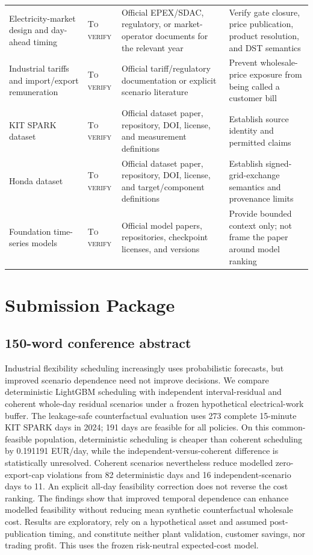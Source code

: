 \documentclass[10pt,twocolumn]{article}
\newcommand{\tverify}{\textsc{To verify}}
\begin{document}
\begin{table}[h]
\begin{tabularx}{\textwidth}{p{}p{}X X}
Electricity-market design and day-ahead timing & \tverify & Official EPEX/SDAC, regulatory, or market-operator documents for the relevant year & Verify gate closure, price publication, product resolution, and DST semantics\\
Industrial tariffs and import/export remuneration & \tverify & Official tariff/regulatory documentation or explicit scenario literature & Prevent wholesale-price exposure from being called a customer bill\\
KIT SPARK dataset & \tverify & Official dataset paper, repository, DOI, license, and measurement definitions & Establish source identity and permitted claims\\
Honda dataset & \tverify & Official dataset paper, repository, DOI, license, and target/component definitions & Establish signed-grid-exchange semantics and provenance limits\\
Foundation time-series models & \tverify & Official model papers, repositories, checkpoint licenses, and versions & Provide bounded context only; not frame the paper around model ranking\\
\bottomrule
\end{tabularx}
\end{table}

\section{Submission Package}
\label{app:submission}

\subsection{150-word conference abstract}

Industrial flexibility scheduling increasingly uses probabilistic forecasts,
but improved scenario dependence need not improve decisions. We compare
deterministic LightGBM scheduling with independent interval-residual and
coherent whole-day residual scenarios under a frozen hypothetical
electrical-work buffer. The leakage-safe counterfactual evaluation uses 273
complete 15-minute KIT SPARK days in 2024; 191 days are feasible for all
policies. On this common-feasible population, deterministic scheduling is
cheaper than coherent scheduling by 0.191191 EUR/day, while the
independent-versus-coherent difference is statistically unresolved. Coherent
scenarios nevertheless reduce modelled zero-export-cap violations from 82
deterministic days and 16 independent-scenario days to 11. An explicit all-day
feasibility correction does not reverse the cost ranking. The findings show
that improved temporal dependence can enhance modelled feasibility without
reducing mean synthetic counterfactual wholesale cost. Results are exploratory,
rely on a hypothetical asset and assumed post-publication timing, and
constitute neither plant validation, customer savings, nor trading profit.
This uses the frozen risk-neutral expected-cost model.
\end{document}
